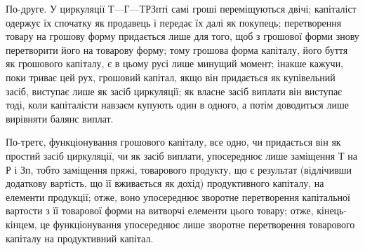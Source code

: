 По-друге. У циркуляції $Т — Г — Т Р Зп т$і самі гроші переміщуються двічі; капіталіст одержує їх
спочатку як продавець і передає їх далі як покупець;
перетворення товару на грошову форму придається лише для того,
щоб з грошової форми знову перетворити його на товарову форму;
тому грошова форма капіталу, його буття як грошового капіталу,
є в цьому русі лише минущий момент; інакше кажучи, поки триває цей
рух, грошовий капітал, якщо він придається як купівельний засіб, виступає
лише як засіб циркуляції; як власне засіб виплати він виступає тоді,
коли капіталісти навзаєм купують один в одного, а потім доводиться
лише вирівняти балянс виплат.

По-третє, функціонування грошового капіталу, все одно, чи придається
він як простий засіб циркуляції, чи як засіб виплати, упосереднює лише
заміщення Т на Р і Зп, тобто заміщення пряжі, товарового продукту,
що є результат (відлічивши додаткову вартість, що її вживається як дохід)
продуктивного капіталу, на елементи продукції; отже, воно упосереднює
зворотне перетворення капітальної вартости з її товарової форми на
витворчі елементи цього товару; отже, кінець-кінцем, це функціонування
упосереднює лише зворотне перетворення товарового капіталу на продуктивний
капітал.
